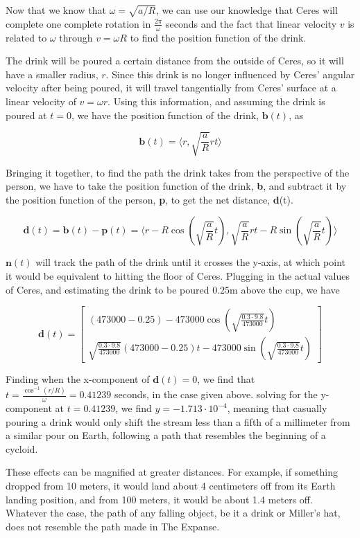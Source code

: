 \documentclass{amsart}
\renewcommand{\vec}{\textbf}
\theoremstyle{definition}
\begin{document}
Now that we know that $\omega = \sqrt{a/R}$, we can use our knowledge that Ceres will complete one complete rotation in $\frac{2\pi}{\omega}$ seconds and the fact that linear velocity $v$ is related to $\omega$ through $v = \omega R$ to find the position function of the drink.

The drink will be poured a certain distance from the outside of Ceres, so it will have a smaller radius, \(r\). Since this drink is no longer influenced by Ceres' angular velocity after being poured, it will travel tangentially from Ceres' surface at a linear velocity of \(v = \omega r\). Using this information, and assuming the drink is poured at $t = 0$, we have the position function of the drink, $\vec{b}(t)$, as

\[
\vec{b}(t) = \langle r, \sqrt{\frac{a}{R}}rt\rangle
\]

Bringing it together, to find the path the drink takes from the perspective of the person, we have to take the position function of the drink, \vec{b}, and subtract it by the position function of the person, \vec{p}, to get the net distance, \vec{d}(t).

\[
\vec{d}(t) = \vec{b}(t) - \vec{p}(t) = \langle r - R\cos(\sqrt{\frac{a}{R}} t), \sqrt{\frac{a}{R}}rt - R \sin(\sqrt{\frac{a}{R}} t)\rangle
\]

$\vec{n}(t)$ will track the path of the drink until it crosses the y-axis, at which point it would be equivalent to hitting the floor of Ceres. Plugging in the actual values of Ceres, and estimating the drink to be poured $0.25$m above the cup, we have

\[
\vec{d}(t) = 
\begin{bmatrix}
(473000 - 0.25) - 473000\cos(\sqrt{\frac{0.3\cdot9.8}{473000}}t)\\ \sqrt{\frac{0.3\cdot9.8}{473000}}(473000 - 0.25)t - 473000 \sin(\sqrt{\frac{0.3\cdot9.8}{473000}}t)
\end{bmatrix}
\]

Finding when the x-component of $\vec{d}(t) = 0$, we find that $t = \frac{\cos^{-1}(r/R)}{\omega} = 0.41239$ seconds, in the case given above. solving for the y-component at $t=0.41239$, we find $y = -1.713 \cdot 10^{-4}$, meaning that casually pouring a drink would only shift the stream less than a fifth of a millimeter from a similar pour on Earth, following a path that resembles the beginning of a cycloid.

These effects can be magnified at greater distances. For example, if something dropped from 10 meters, it would land about 4 centimeters off from its Earth landing position, and from 100 meters, it would be about 1.4 meters off. Whatever the case, the path of any falling object, be it a drink or Miller's hat, does not resemble the path made in The Expanse.
\end{document}
